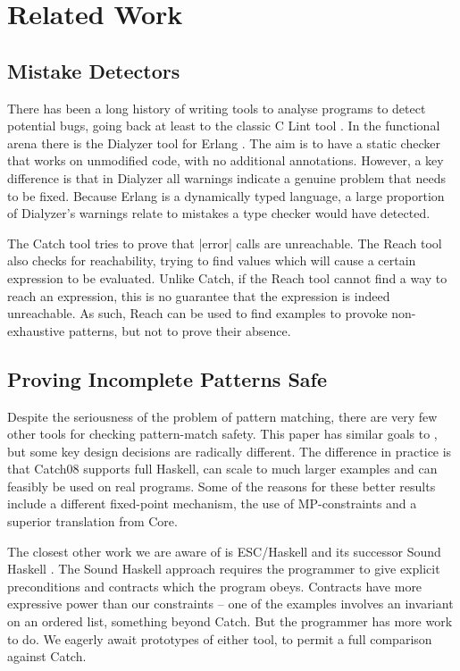 \documentclass[preprint]{sigplanconf}
\begin{document}
\section{Related Work}
\label{sec:related}

\subsection{Mistake Detectors}

There has been a long history of writing tools to analyse programs to detect potential bugs, going back at least to the classic C Lint tool \cite{lint}. In the functional arena there is the Dialyzer tool \cite{dialyzer} for Erlang \cite{erlang}. The aim is to have a static checker that works on unmodified code, with no additional annotations. However, a key difference is that in Dialyzer all warnings indicate a genuine problem that needs to be fixed. Because Erlang is a dynamically typed language, a large proportion of Dialyzer's warnings relate to mistakes a type checker would have detected.

The Catch tool tries to prove that |error| calls are unreachable. The Reach tool \cite{naylor:reach} also checks for reachability, trying to find values which will cause a certain expression to be evaluated. Unlike Catch, if the Reach tool cannot find a way to reach an expression, this is no guarantee that the expression is indeed unreachable. As such, Reach can be used to find examples to provoke non-exhaustive patterns, but not to prove their absence.


\subsection{Proving Incomplete Patterns Safe}

Despite the seriousness of the problem of pattern matching, there are very few other tools for checking pattern-match safety. This paper has similar goals to \citet{me:catch_tfp}, but some key design decisions are radically different. The difference in practice is that Catch08 supports full Haskell, can scale to much larger examples and can feasibly be used on real programs. Some of the reasons for these better results include a different fixed-point mechanism, the use of MP-constraints and a superior translation from Core.

The closest other work we are aware of is ESC/Haskell \cite{esc_haskell} and its successor Sound Haskell \cite{xu:sound_haskell}. The Sound Haskell approach requires the programmer to give explicit preconditions and contracts which the program obeys. Contracts have more expressive power than our constraints -- one of the examples involves an invariant on an ordered list, something beyond Catch. But the programmer has more work to do. We eagerly await prototypes of either tool, to permit a full comparison against Catch.
\end{document}
